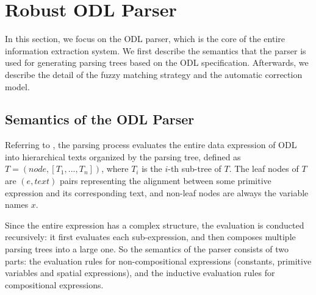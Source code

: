 \section{Robust ODL Parser}
\label{sec:parsing}

In this section, we focus on the ODL parser,
which is the core of the entire information extraction system.
We first describe the semantics that the parser is used for generating
parsing trees based on the ODL specification.
Afterwards, we describe the detail of the fuzzy matching strategy
and the automatic correction model.

\subsection{Semantics of the ODL Parser}
Referring to ,
the parsing process evaluates the entire data expression of ODL
into hierarchical texts organized by the parsing tree,
defined as $T = (node, [T_1, ..., T_n])$,
where $T_i$ is the $i$-th sub-tree of $T$.
The leaf nodes of $T$ are $(e, text)$ pairs representing the alignment
between some primitive expression and its corresponding text,
and non-leaf nodes are always the variable names $x$.

Since the entire expression has a complex structure,
the evaluation is conducted recursively:
it first evaluates each sub-expression, and then composes multiple parsing trees
into a large one.
So the semantics of the parser consists of two parts:
the evaluation rules for non-compositional expressions
(constants, primitive variables and spatial expressions),
and the inductive evaluation rules for compositional expressions.

